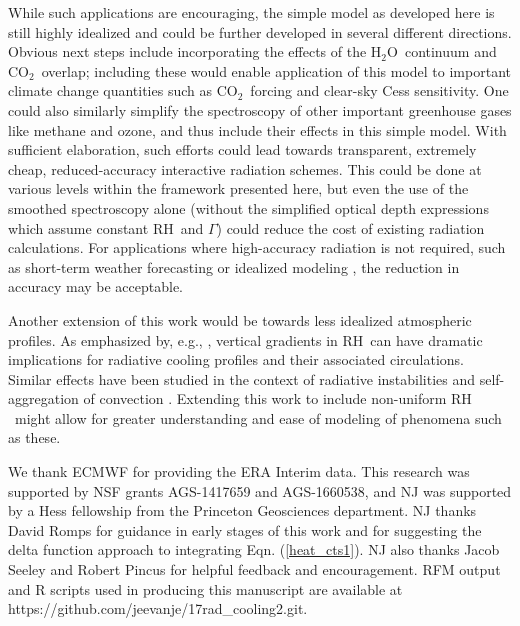\documentclass{ametsoc}
\newcommand{\eqnref}[1]{(\ref{#1})}
\newcommand{\cotwo}{\ensuremath{\mathrm{CO_2}}}
\newcommand{\htwo}{\ensuremath{\mathrm{H_2O}}}
\newcommand{\RH}{\ensuremath{\mathrm{RH}}}
\begin{document}
While such applications are encouraging, the simple model as developed here is still highly idealized and could be further developed in several different directions. Obvious next steps include incorporating the effects of the \htwo\ continuum and \cotwo\ overlap; including these would enable application of this model to important climate change quantities such as  \cotwo\ forcing and clear-sky Cess sensitivity. One could also similarly simplify the spectroscopy of other important greenhouse gases like methane and ozone, and thus include their effects in this simple model. With sufficient elaboration, such efforts could lead towards transparent, extremely cheap, reduced-accuracy interactive radiation schemes. This could be done at various levels within the framework presented here, but even the use of the smoothed spectroscopy  alone (without the simplified optical depth expressions which assume constant \RH\ and $\Gamma$) could reduce the cost of existing radiation calculations. For applications where high-accuracy radiation is not required, such as short-term weather forecasting or idealized modeling \citep[e.g. idealized aquaplanets such as that of][]{frierson2006}, the reduction in accuracy may be acceptable.

Another extension of this work would be towards less idealized atmospheric profiles. As emphasized by, e.g., \cite{stevens2017},  vertical gradients in \RH\ can have dramatic implications for radiative cooling profiles and their associated  circulations. Similar effects have been studied in the context of radiative instabilities and self-aggregation of convection \citep{beucler2018,beucler2016,emanuel2014}. Extending this work to include non-uniform \RH\ might allow for greater understanding and  ease of modeling of phenomena such as these. 




%
\acknowledgments
We thank ECMWF for providing the ERA Interim data. This research was supported by NSF grants AGS-1417659 and AGS-1660538, and NJ was supported by a  Hess fellowship from the Princeton Geosciences department. NJ thanks David Romps for guidance in early stages of this work and for suggesting the delta function approach to integrating Eqn. \eqnref{heat_cts1}. NJ also thanks  Jacob Seeley and Robert Pincus for helpful feedback and encouragement. RFM output and R scripts used in producing this manuscript are available at  https://github.com/jeevanje/17rad\_cooling2.git.
\end{document}
